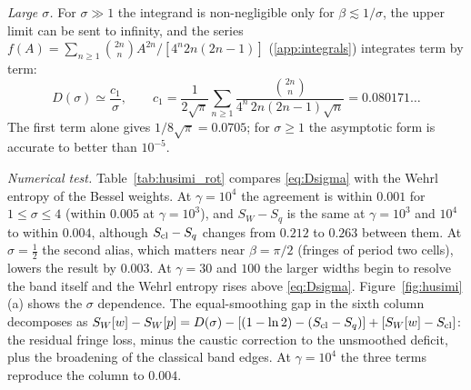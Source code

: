\documentclass[preprint,12pt]{elsarticle}
\newcommand{\Scl}{S_{\rm cl}}
\newcommand{\SW}{S_{W}}
\begin{document}
\emph{Large $\sigma$.} For $\sigma\gg1$ the integrand is non-negligible only for
$\beta\lesssim1/\sigma$, the upper limit can be sent to infinity, and the series
$f(A)=\sum_{n\ge1}\binom{2n}{n}A^{2n}/[4^{n}2n(2n-1)]$ (\ref{app:integrals})
integrates term by term:
\begin{equation}
D(\sigma)\simeq\frac{c_{1}}{\sigma},\qquad
c_{1}=\frac{1}{2\sqrt\pi}\sum_{n\ge1}\frac{\binom{2n}{n}}{4^{n}\,2n(2n-1)\sqrt n}
=0.080171\ldots
\label{eq:c1}
\end{equation}
The first term alone gives $1/8\sqrt\pi=0.0705$; for $\sigma\ge1$ the asymptotic
form is accurate to better than $10^{-5}$.

\emph{Numerical test.} Table~\ref{tab:husimi_rot} compares \eqref{eq:Dsigma} with
the Wehrl entropy of the Bessel weights. At $\gamma=10^{4}$ the agreement is
within $0.001$ for $1\le\sigma\le4$ (within $0.005$ at $\gamma=10^{3}$), and
$\SW-S_{q}$ is the same at $\gamma=10^{3}$ and $10^{4}$ to within $0.004$,
although $\Scl-S_{q}$ changes from $0.212$ to $0.263$ between them. At $\sigma=\tfrac12$ the second alias, which
matters near $\beta=\pi/2$ (fringes of period two cells), lowers the result by
$0.003$. At $\gamma=30$ and $100$ the larger widths begin to resolve the band
itself and the Wehrl entropy rises above \eqref{eq:Dsigma}.
Figure~\ref{fig:husimi}(a) shows the $\sigma$ dependence. The equal-smoothing
gap in the sixth column decomposes as
$\SW[w]-\SW[p]=D(\sigma)-[(1-\ln2)-(\Scl-S_{q})]+[\SW[w]-\Scl]$: the residual
fringe loss, minus the caustic correction to the unsmoothed deficit, plus the
broadening of the classical band edges. At $\gamma=10^{4}$ the three terms
reproduce the column to $0.004$.
\end{document}
